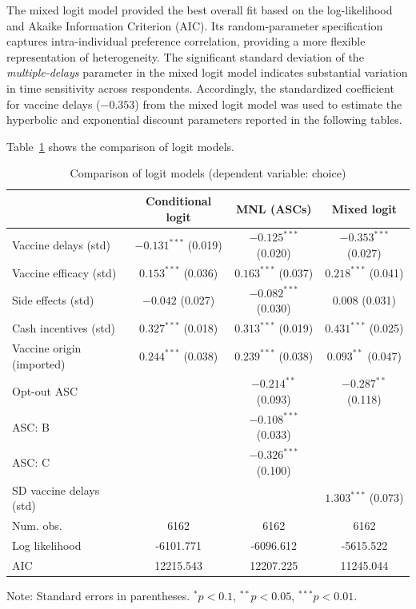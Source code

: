 \documentclass[preprint,12pt]{elsarticle}
\begin{document}
The mixed logit model provided the best overall fit based on the log-likelihood and Akaike Information Criterion (AIC). Its random-parameter specification captures intra-individual preference correlation, providing a more flexible representation of heterogeneity. The significant standard deviation of the \textit{multiple-delays} parameter in the mixed logit model indicates substantial variation in time sensitivity across respondents. Accordingly, the standardized coefficient for vaccine delays ($-0.353$) from the mixed logit model was used to estimate the hyperbolic and exponential discount parameters reported in the following tables.

Table~\ref{tab:models} shows the comparison of logit models.


\begin{table}[!t]
\centering
\caption{Comparison of logit models (dependent variable: choice)}
\label{tab:models}
\begin{threeparttable}
\begin{tabular}{lccc}
\toprule
 & Conditional logit & MNL (ASCs) & Mixed logit \\
\midrule
Vaccine delays (std) & $-0.131^{***}$ (0.019) & $-0.125^{***}$ (0.020) & $-0.353^{***}$ (0.027) \\
Vaccine efficacy (std) & $0.153^{***}$ (0.036) & $0.163^{***}$ (0.037) & $0.218^{***}$ (0.041) \\
Side effects (std) & $-0.042$ (0.027) & $-0.082^{***}$ (0.030) & $0.008$ (0.031) \\
Cash incentives (std) & $0.327^{***}$ (0.018) & $0.313^{***}$ (0.019) & $0.431^{***}$ (0.025) \\
Vaccine origin (imported) & $0.244^{***}$ (0.038) & $0.239^{***}$ (0.038) & $0.093^{**}$ (0.047) \\
Opt-out ASC &  & $-0.214^{**}$ (0.093) & $-0.287^{**}$ (0.118) \\
ASC: B &  & $-0.108^{***}$ (0.033) &  \\
ASC: C &  & $-0.326^{***}$ (0.100) &  \\
SD vaccine delays (std) &  &  & $1.303^{***}$ (0.073) \\
Num. obs. & 6162 & 6162 & 6162 \\
Log likelihood & -6101.771 & -6096.612 & -5615.522 \\
AIC & 12215.543 & 12207.225 & 11245.044 \\
\bottomrule
\end{tabular}
\begin{tablenotes}[flushleft]
\footnotesize
\item Note: Standard errors in parentheses. $^{*}p<0.1$, $^{**}p<0.05$, $^{***}p<0.01$.
\end{tablenotes}
\end{threeparttable}
\end{table}
\end{document}
